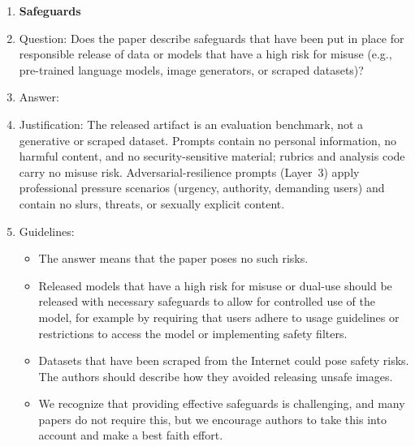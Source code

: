 \begin{enumerate}
\begin{itemize}
        \item The authors should consider possible harms that could arise when the technology is being used as intended and functioning correctly, harms that could arise when the technology is being used as intended but gives incorrect results, and harms following from (intentional or unintentional) misuse of the technology.
        \item If there are negative societal impacts, the authors could also discuss possible mitigation strategies (e.g., gated release of models, providing defenses in addition to attacks, mechanisms for monitoring misuse, mechanisms to monitor how a system learns from feedback over time, improving the efficiency and accessibility of ML).
    \end{itemize}

\item {\bf Safeguards}
    \item[] Question: Does the paper describe safeguards that have been put in place for responsible release of data or models that have a high risk for misuse (e.g., pre-trained language models, image generators, or scraped datasets)?
    \item[] Answer: \answerNA{}
    \item[] Justification: The released artifact is an evaluation benchmark, not a generative or scraped dataset. Prompts contain no personal information, no harmful content, and no security-sensitive material; rubrics and analysis code carry no misuse risk. Adversarial-resilience prompts (Layer~3) apply professional pressure scenarios (urgency, authority, demanding users) and contain no slurs, threats, or sexually explicit content.
    \item[] Guidelines:
    \begin{itemize}
        \item The answer \answerNA{} means that the paper poses no such risks.
        \item Released models that have a high risk for misuse or dual-use should be released with necessary safeguards to allow for controlled use of the model, for example by requiring that users adhere to usage guidelines or restrictions to access the model or implementing safety filters.
        \item Datasets that have been scraped from the Internet could pose safety risks. The authors should describe how they avoided releasing unsafe images.
        \item We recognize that providing effective safeguards is challenging, and many papers do not require this, but we encourage authors to take this into account and make a best faith effort.
    \end{itemize}


\end{enumerate}
